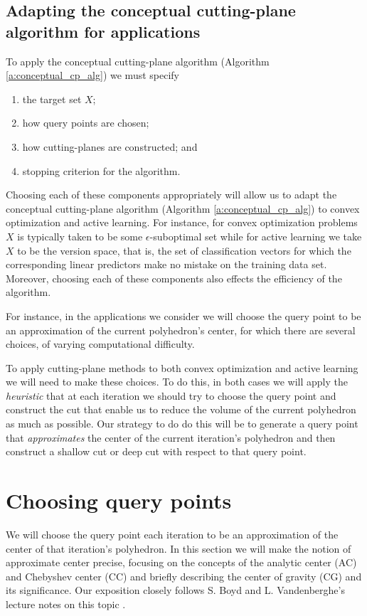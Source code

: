 \documentclass[11pt]{amsart}
\theoremstyle{definition}
\theoremstyle{remark}
\begin{document}
    \subsection{Adapting the conceptual cutting-plane algorithm for applications}\label{ss:adapt}
        To apply the conceptual cutting-plane algorithm (Algorithm \ref{a:conceptual_cp_alg}) we must specify
        \begin{enumerate}
            \item the target set $X$;
            \item how query points are chosen; 
            \item how cutting-planes are constructed; and 
            \item stopping criterion for the algorithm.
        \end{enumerate}

        Choosing each of these components appropriately will allow us to adapt the conceptual cutting-plane algorithm (Algorithm \ref{a:conceptual_cp_alg}) to convex optimization and active learning. For instance, for convex optimization problems $X$ is typically taken to be some $\epsilon$-suboptimal set while for active learning we take $X$ to be the version space, that is, the set of classification vectors for which the corresponding linear predictors make no mistake on the training data set. Moreover, choosing each of these components also effects the efficiency of the algorithm. 

        For instance, in the applications we  consider we will choose the query point to be an approximation of the current polyhedron's center, for which there are several choices, of varying computational difficulty. 

        To apply cutting-plane methods to both convex optimization and active learning we will need to make these choices. To do this, in both cases we will apply the \emph{heuristic} that at each iteration we should try to choose the query point and construct the cut that enable us to reduce the volume of the current polyhedron as much as possible. Our strategy to do do this will be to generate a query point that \emph{approximates} the center of the current iteration's polyhedron and then construct a shallow cut or deep cut with respect to that query point.




\section{Choosing query points}
    We will choose the query point each iteration to be an approximation of the center of that iteration's polyhedron. In this section we will make the notion of approximate center precise, focusing on the concepts of the analytic center (AC) and Chebyshev center (CC) and briefly describing the center of gravity (CG) and its significance. Our exposition closely follows S. Boyd and L. Vandenberghe's lecture notes on this topic \cite[Section 4]{BV11}.  
\end{document}
